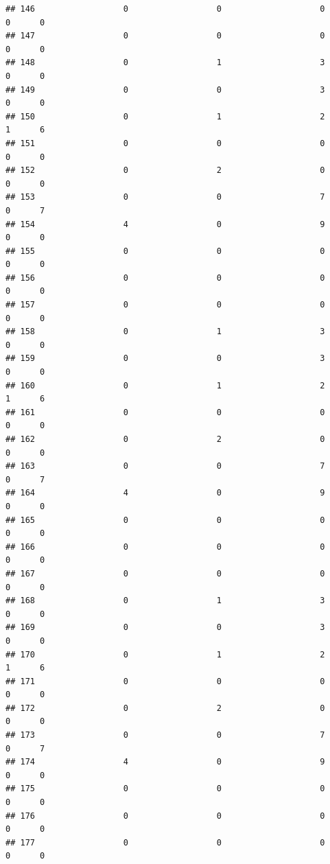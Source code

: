 \documentclass[
]{article}
\begin{document}
\begin{verbatim}
## 146                  0                  0                    0        0      0
## 147                  0                  0                    0        0      0
## 148                  0                  1                    3        0      0
## 149                  0                  0                    3        0      0
## 150                  0                  1                    2        1      6
## 151                  0                  0                    0        0      0
## 152                  0                  2                    0        0      0
## 153                  0                  0                    7        0      7
## 154                  4                  0                    9        0      0
## 155                  0                  0                    0        0      0
## 156                  0                  0                    0        0      0
## 157                  0                  0                    0        0      0
## 158                  0                  1                    3        0      0
## 159                  0                  0                    3        0      0
## 160                  0                  1                    2        1      6
## 161                  0                  0                    0        0      0
## 162                  0                  2                    0        0      0
## 163                  0                  0                    7        0      7
## 164                  4                  0                    9        0      0
## 165                  0                  0                    0        0      0
## 166                  0                  0                    0        0      0
## 167                  0                  0                    0        0      0
## 168                  0                  1                    3        0      0
## 169                  0                  0                    3        0      0
## 170                  0                  1                    2        1      6
## 171                  0                  0                    0        0      0
## 172                  0                  2                    0        0      0
## 173                  0                  0                    7        0      7
## 174                  4                  0                    9        0      0
## 175                  0                  0                    0        0      0
## 176                  0                  0                    0        0      0
## 177                  0                  0                    0        0      0

\end{verbatim}
\end{document}
